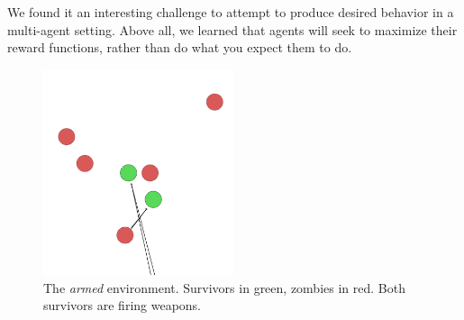 \documentclass[11pt,a4paper]{article}
\begin{document}
We found it an interesting challenge to attempt to produce desired behavior in a multi-agent setting.
Above all, we learned that agents will seek to maximize their reward functions, rather than do what you expect them to do.

\begin{figure}
  \centering
  \includegraphics[width=0.5\textwidth]{figures/screencapture.png}
  \caption{
    The \emph{armed} environment.
    Survivors in green, zombies in red.
    Both survivors are firing weapons.
  }
  \label{fig:baseline_reward}
\end{figure}



\end{document}
